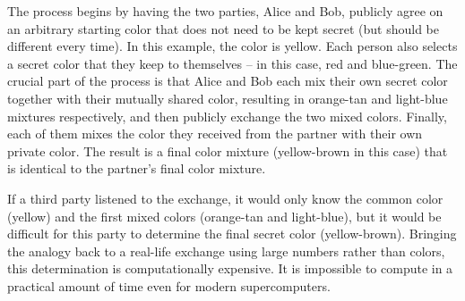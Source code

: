 The process begins by having the two parties, Alice and Bob, publicly agree on an arbitrary starting color that does
not need to be kept secret (but should be different every time).
In this example, the color is yellow.
Each person also selects a secret color that they keep to themselves – in this case, red and blue-green.
The crucial part of the process is that Alice and Bob each mix their own secret color together with their mutually
shared color, resulting in orange-tan and light-blue mixtures respectively, and then publicly exchange the two mixed colors.
Finally, each of them mixes the color they received from the partner with their own private color.
The result is a final color mixture (yellow-brown in this case) that is identical to the partner's final color mixture.

If a third party listened to the exchange, it would only know the common color (yellow) and the first mixed colors
(orange-tan and light-blue), but it would be difficult for this party to determine the final secret color (yellow-brown).
Bringing the analogy back to a real-life exchange using large numbers rather than colors, this determination is
computationally expensive.
It is impossible to compute in a practical amount of time even for modern supercomputers.


